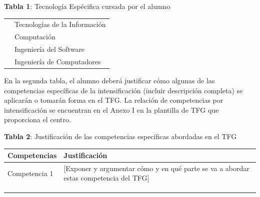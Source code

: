 \documentclass[11pt,a4paper,twoside,final]{article}
\begin{document}
\begin{center}
   \textbf{Tabla 1}: Tecnología Espécifica cursada por el alumno\\[1em]
   \begin{tabular}{cl}
		\hline
          & Tecnologías de la Información \\
          & Computación   \\
          & Ingeniería del Software \\
		\ding{52}		& Ingeniería de Computadores \\
		\hline
   \end{tabular}
\end{center}

En la segunda tabla, el alumno deberá justificar cómo algunas de las competencias específicas de la intensificación (incluir descripción completa) se aplicarán o tomarán forma en el TFG. La relación de competencias por intensificación se encuentran en el Anexo I en la plantilla de TFG que proporciona el centro.


\begin{center}
   \textbf{Tabla 2}: Justificación de las competencias específicas abordadas en el TFG\\[1em]
   \begin{tabular}{p{} p{}}
		\textbf{Competencias} & \textbf{Justificación} \\
		\hline
			Competencia 1 & [Exponer y argumentar cómo y en qué parte se va a abordar estas competencia del TFG] \\
          &    \\
          &    \\
					&    \\
		\hline
   \end{tabular}
\end{center}
\end{document}
